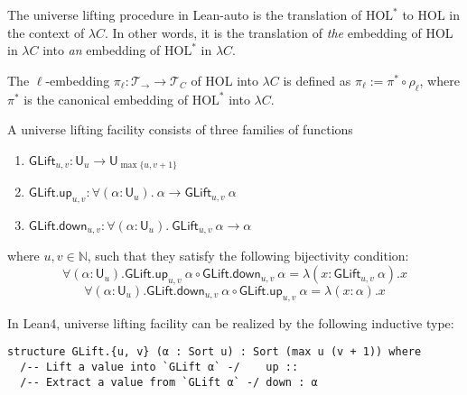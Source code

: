   \noindent The universe lifting procedure in Lean-auto is the translation of $\text{HOL}^*$
  to HOL in the context of $\lambda C$. In other words, it is the translation of \textit{the}
  embedding of HOL in $\lambda C$ into \textit{an} embedding of $\text{HOL}^*$ in $\lambda C$.

  \begin{definition}
    The $\ell$-embedding $\pi_\ell : \mathcal{T}_\to \to \mathcal{T}_C$ of HOL into
    $\lambda C$ is defined as $\pi_\ell := \pi^* \circ \rho_\ell$, where $\pi^*$ is the
    canonical embedding of $\text{HOL}^*$ into $\lambda C$.
  \end{definition}

  \begin{definition}
    A universe lifting facility consists of three families of functions
    \begin{enumerate}
      \item $\mathsf{GLift}_{u, v} : \mathsf{U}_u \to \mathsf{U}_{\max\{u, v + 1\}}$
      \item $\mathsf{GLift.up}_{u, v} : \forall (\alpha : \mathsf{U}_u). \ \alpha \to \mathsf{GLift}_{u, v} \ \alpha$
      \item $\mathsf{GLift.down}_{u, v} : \forall (\alpha : \mathsf{U}_u). \ \mathsf{GLift}_{u, v} \ \alpha \to \alpha$
    \end{enumerate}
    where $u, v \in \mathbb{N}$, such that they satisfy the following bijectivity condition:
    $$\forall (\alpha : \mathsf{U}_u). \mathsf{GLift.up}_{u, v} \ \alpha \circ \mathsf{GLift.down}_{u, v} \ \alpha = \lambda (x : \mathsf{GLift}_{u, v} \ \alpha). x$$
    $$\forall (\alpha : \mathsf{U}_u). \mathsf{GLift.down}_{u, v} \ \alpha \circ \mathsf{GLift.up}_{u, v} \ \alpha = \lambda (x : \alpha). x$$
  \end{definition}

  \noindent In Lean4, universe lifting facility can be realized by the following inductive type:
  
  \begin{lstlisting}[style=leanHH]
structure GLift.{u, v} (α : Sort u) : Sort (max u (v + 1)) where
  /-- Lift a value into `GLift α` -/    up ::
  /-- Extract a value from `GLift α` -/ down : α
  \end{lstlisting}

